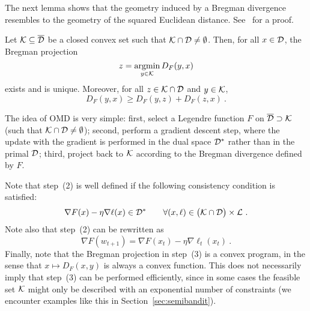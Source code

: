 The next lemma shows that the geometry induced by a Bregman divergence resembles to the geometry of the squared Euclidean distance. See~\cite[Lemma~11.3]{CL06} for a proof.
%
\begin{lemma} \label{lem:proj}
Let $\mathcal{K} \subseteq \overline{\mathcal{D}}$ be a closed convex set such that $\mathcal{K} \cap \mathcal{D} \neq \emptyset$. Then, for all $x \in \mathcal{D}$, the Bregman projection
$$z = \mathop{\mathrm{argmin}}_{y \in \mathcal{K}} D_F(y,x)$$
exists and is unique. Moreover, for all $z \in \mathcal{K} \cap \mathcal{D}$ and $y \in \mathcal{K}$,
$$D_F(y,x) \geq D_F(y,z) + D_F(z,x)~.$$
\end{lemma}
%
The idea of OMD is very simple: first, select a Legendre function $F$ on $\overline{\mathcal{D}} \supset \mathcal{K}$ (such that $\mathcal{K} \cap \mathcal{D} \neq \emptyset$); second, perform a gradient descent step, where the update with the gradient is performed in the dual space $\mathcal{D}^*$ rather than in the primal $\mathcal{D}$; third, project back to $\mathcal{K}$ according to the Bregman divergence defined by $F$.
%

Note that step~(2) is well defined if the following consistency condition is satisfied:
\begin{equation} \label{eq:consistency}
\nabla F(x) - \eta \nabla \ell(x) \in \mathcal{D}^* \qquad \forall (x,\ell) \in \bigl(\mathcal{K} \cap \mathcal{D}\bigr) \times \mathcal{L}~. 
\end{equation}
Note also that step~(2) can be rewritten as
\begin{equation} \label{eq:MGD3}
\nabla F(w_{t+1}) = \nabla F(x_t) - \eta \nabla \ell_t(x_t)~.
\end{equation}
Finally, note that the Bregman projection in step~(3) is a convex program, in the sense that $x \mapsto D_F(x,y)$ is always a convex function. This does not necessarily imply that step~(3) can be performed efficiently, since in some cases the feasible set $\mathcal{K}$ might only be described with an exponential number of constraints (we encounter examples like this in Section~\ref{sec:semibandit}).

